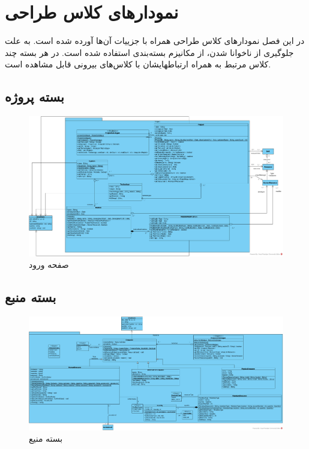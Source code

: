 \chapter{نمودارهای کلاس طراحی}
در این فصل نمودارهای کلاس طراحی همراه با جزییات آن‌ها آورده شده است. به علت جلوگیری از ناخوانا شدن، از مکانیزم بسته‌بندی
استفاده شده است. در هر بسته چند کلاس مرتبط به همراه ارتباطهایشان با کلاس‌های بیرونی قابل مشاهده است.
\section{بسته پروژه}
\begin{figure}[H]
	\centering
	\includegraphics[scale=0.45]{img/class-design/ProjectPackage}
	\caption{صفحه ورود}
\end{figure}

\section{بسته منبع}
\begin{figure}[H]
	\centering
	\includegraphics[scale=0.45]{img/class-design/ResourcePackage}
	\caption{بسته منیع}
\end{figure}

